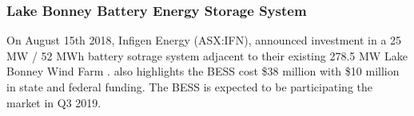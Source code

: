\subsubsection{ Lake Bonney Battery Energy Storage System }
On August 15th 2018, Infigen Energy (ASX:IFN), announced investment in a 25 MW / 52 MWh battery sotrage system adjacent to their existing 278.5 MW Lake Bonney Wind Farm \parencite{IFN_AFR}. \textcite{IFN_AFR} also highlights the BESS cost \$38 million with \$10 million in state and federal funding. The BESS is expected to be participating the market in Q3 2019.

